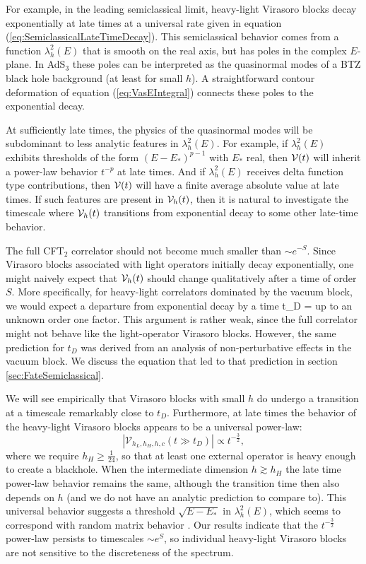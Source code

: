 For example, in the leading semiclassical limit, heavy-light Virasoro blocks decay exponentially at late times at a universal rate given in equation (\ref{eq:SemiclassicalLateTimeDecay}).   This semiclassical behavior comes from a function $\lambda_h^2(E)$ that is smooth on the real axis, but has poles in the complex $E$-plane. In AdS$_3$ these poles can be interpreted as the quasinormal modes of a BTZ black hole background (at least for small $h$).  A straightforward contour deformation of equation (\ref{eq:VasEIntegral}) connects these poles to the exponential decay.

At sufficiently late times, the physics of the quasinormal modes will be subdominant to less analytic features in $\lambda_h^2(E)$.  For example, if $\lambda_h^2(E)$ exhibits thresholds of the form  $(E-E_*)^{p-1}$ with $E_*$ real, then ${\cal V}(t)$ will inherit a power-law behavior $t^{-p}$ at late times.  And if $\lambda_h^2(E)$ receives delta function type contributions, then ${\cal V}(t)$ will have a finite average absolute value at late times.  If such features are present in ${\cal V}_h(t)$, then it is natural to investigate the timescale where ${\cal V}_h(t)$ transitions from exponential decay to some other late-time behavior.  

The full CFT$_2$ correlator should not become much smaller than $\sim e^{-S}$.  Since Virasoro blocks associated with light operators initially decay exponentially, one might naively expect that ${\cal V}_h(t)$ should change qualitatively after a time of order $S$.  More specifically, for heavy-light correlators dominated by the vacuum block, we would expect a departure from exponential decay by a time
\be\label{eq:deftD}
t_D = 
\ee
up to an unknown order one factor.   This argument is rather weak, since the full correlator might not behave like the light-operator Virasoro blocks.  However, the same prediction for $t_D$ was derived from an analysis of non-perturbative effects \cite{Fitzpatrick:2016ive} in the vacuum block.  We discuss the equation that led to that prediction in section \ref{sec:FateSemiclassical}.

We will see empirically that Virasoro blocks with small $h$ do undergo a transition at a timescale remarkably close to $t_D$.  Furthermore, at late times the behavior of the heavy-light Virasoro blocks appears to be a universal power-law:
\begin{equation}
|\mathcal{V}_{h_{L},h_{H},h,c}\left(t\gg t_D\right)| \propto t^{-\frac{3}{2}},
\end{equation}
where we require $h_H\ge\frac{1}{24}$, so that at least one external operator is heavy enough to create a blackhole.  When the intermediate dimension $h \gtrsim h_H$ the late time power-law behavior remains the same, although the transition time then also depends on $h$ (and we do not have an analytic prediction to compare to).  This universal behavior suggests a threshold $\sqrt{E - E_*}$ in $\lambda_h^2(E)$, which seems to correspond with random matrix behavior \cite{Guhr:1997ve, Cotler:2016fpe, Garcia-Garcia:2016mno}.  Our results indicate that  the $t^{-\frac{3}{2}}$ power-law persists to timescales $\sim e^S$, so individual heavy-light Virasoro blocks are not sensitive to the discreteness of the spectrum.

